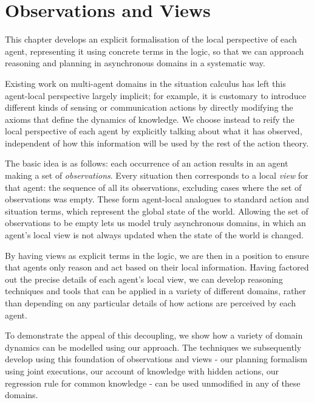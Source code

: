 

\chapter{Observations and Views}

\label{ch:observations}

This chapter develops an explicit formalisation of the local perspective
of each agent, representing it using concrete terms in the logic,
so that we can approach reasoning and planning in asynchronous domains
in a systematic way.

Existing work on multi-agent domains in the situation calculus has
left this agent-local perspective largely implicit; for example, it
is customary to introduce different kinds of sensing or communication
actions by directly modifying the axioms that define the dynamics
of knowledge. We choose instead to reify the local perspective of
each agent by explicitly talking about what it has observed, independent
of how this information will be used by the rest of the action theory.

The basic idea is as follows: each occurrence of an action results
in an agent making a set of \emph{observations}. Every situation then
corresponds to a local \emph{view} for that agent: the sequence of
all its observations, excluding cases where the set of observations
was empty. These form agent-local analogues to standard action and
situation terms, which represent the global state of the world. Allowing
the set of observations to be empty lets us model truly asynchronous
domains, in which an agent's local view is not always updated when
the state of the world is changed.

By having views as explicit terms in the logic, we are then in a position
to ensure that agents only reason and act based on their local information.
Having factored out the precise details of each agent's local view,
we can develop reasoning techniques and tools that can be applied
in a variety of different domains, rather than depending on any particular
details of how actions are perceived by each agent.

To demonstrate the appeal of this decoupling, we show how a variety
of domain dynamics can be modelled using our approach. The techniques
we subsequently develop using this foundation of observations and
views - our planning formalism using joint executions, our account
of knowledge with hidden actions, our regression rule for common knowledge
- can be used unmodified in any of these domains.

